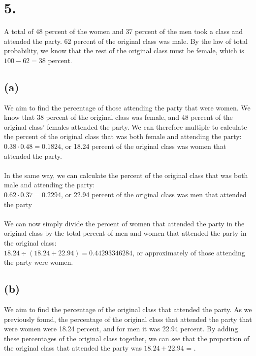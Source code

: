 \documentclass{article}
\begin{document}
\section*{5.}
{\Large 
A total of 48 percent of the women and 37 percent of the men took a class and attended the party. 62 percent of the original class was male. By the law of total probability, we know that the rest of the original class must be female, which is $100 - 62 = 38$ percent.

\subsection*{(a)}
We aim to find the percentage of those attending the party that were women. We know that 38 percent of the original class was female, and 48 percent of the original class' females attended the party. We can therefore multiple to calculate the percent of the original class that was both female and attending the party: \\
$0.38 \cdot 0.48 = 0.1824$, or 18.24 percent of the original class was women that attended the party. \\ \\
In the same way, we can calculate the percent of the original class that was both male and attending the party: \\
$0.62 \cdot 0.37 = 0.2294$, or 22.94 percent of the original class was men that attended the party \\ \\
We can now simply divide the percent of women that attended the party in the original class by the total percent of men and women that attended the party in the original class: \\
$18.24 \div (18.24 + 22.94) = 0.44293346284$, or approximately  of those attending the party were women.

\subsection*{(b)}
We aim to find the percentage of the original class that attended the party. As we previously found, the percentage of the original class that attended the party that were women were 18.24 percent, and for men it was 22.94 percent. By adding these percentages of the original class together, we can see that the proportion of the original class that attended the party was $18.24 + 22.94$ = .

}
\end{document}
